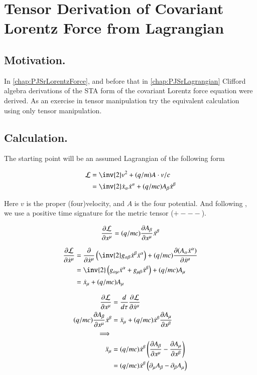 \chapter{Tensor Derivation of Covariant Lorentz Force from Lagrangian}
\date{ October 12, 2008.  $RCSfile: maxwellTensorLagrangian.tex,v $ Last $Revision: 1.11 $ $Date: 2009/06/11 16:45:58 $ }

\section{Motivation. }

In \ref{chap:PJSrLorentzForce}, and before that in \ref{chap:PJSrLagrangian} Clifford
algebra derivations of the STA form of the covariant Lorentz force equation
were derived.  As an exercise in tensor manipulation try the equivalent
calculation using only tensor manipulation.

\section{Calculation. }

The starting point will be an assumed Lagrangian of the following form

\begin{align}\label{eqn:maxwell_tensor_lagrangian:lagrangian}
\LL &= \inv{2} v^2 + (q/m) A \cdot v/c \\
&= \inv{2} \xdot_\alpha \xdot^\alpha + (q/mc) A_\beta \xdot^\beta
\end{align}

Here $v$ is the proper (four)velocity, and $A$ is the four potential.
And following \cite{doran2003gap}, we use a positive time signature for the metric tensor ($+---$).

\begin{align*}
\PD{x^\mu}{\LL} = (q/mc) \PD{x^\mu}{A_\beta} \xdot^\beta
\end{align*}

\begin{align*}
\PD{\xdot^\mu}{\LL}
&= \PD{\xdot^\mu}{} \left( \inv{2} g_{\alpha\beta} \xdot^\beta \xdot^\alpha \right) + (q/mc) \PD{\xdot^\mu}{(A_\alpha \xdot^\alpha)} \\
&= \inv{2} \left( g_{\alpha\mu} \xdot^\alpha +g_{\mu\beta} \xdot^\beta \right) + (q/mc) A_\mu \\
&= \xdot_\mu + (q/mc) A_\mu \\
\end{align*}

\begin{align*}
\PD{x^\mu}{\LL} &= \frac{d}{d\tau} \PD{\xdot^\mu}{\LL} \\
(q/mc) \PD{x^\mu}{A_\beta} \xdot^\beta &= \xddot_\mu + (q/mc) \xdot^\beta \PD{x^\beta}{A_\mu} \\
\implies \\
\xddot_\mu
&= (q/mc) \xdot^\beta \left( \PD{x^\mu}{A_\beta} - \PD{x^\beta}{A_\mu} \right) \\
&= (q/mc) \xdot^\beta \left( \partial_\mu {A_\beta} - \partial_{\beta}{A_\mu} \right) \\
\end{align*}

